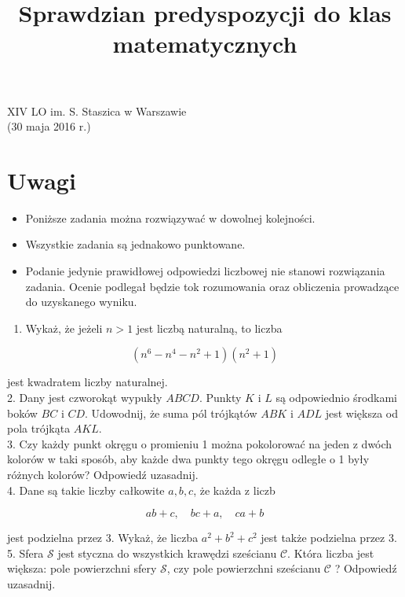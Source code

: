 \documentclass[10pt]{article}
\title{Sprawdzian predyspozycji do klas matematycznych }
\author{}
\date{}
\begin{document}
\maketitle
XIV LO im. S. Staszica w Warszawie\\
(30 maja 2016 r.)

\section*{Uwagi}
\begin{itemize}
  \item Poniższe zadania można rozwiązywać w dowolnej kolejności.
  \item Wszystkie zadania są jednakowo punktowane.
  \item Podanie jedynie prawidłowej odpowiedzi liczbowej nie stanowi rozwiązania zadania. Ocenie podlegał będzie tok rozumowania oraz obliczenia prowadzące do uzyskanego wyniku.
\end{itemize}

\begin{enumerate}
  \item Wykaż, że jeżeli \(n>1\) jest liczbą naturalną, to liczba
\end{enumerate}

\[
\left(n^{6}-n^{4}-n^{2}+1\right)\left(n^{2}+1\right)
\]

jest kwadratem liczby naturalnej.\\
2. Dany jest czworokąt wypukły \(A B C D\). Punkty \(K\) i \(L\) są odpowiednio środkami boków \(B C\) i \(C D\). Udowodnij, że suma pól trójkątów \(A B K\) i \(A D L\) jest większa od pola trójkąta \(A K L\).\\
3. Czy każdy punkt okręgu o promieniu 1 można pokolorować na jeden z dwóch kolorów w taki sposób, aby każde dwa punkty tego okręgu odległe o 1 były różnych kolorów? Odpowiedź uzasadnij.\\
4. Dane są takie liczby całkowite \(a, b, c\), że każda z liczb

\[
a b+c, \quad b c+a, \quad c a+b
\]

jest podzielna przez 3. Wykaż, że liczba \(a^{2}+b^{2}+c^{2}\) jest także podzielna przez 3.\\
5. Sfera \(\mathcal{S}\) jest styczna do wszystkich krawędzi sześcianu \(\mathcal{C}\). Która liczba jest większa: pole powierzchni sfery \(\mathcal{S}\), czy pole powierzchni sześcianu \(\mathcal{C}\) ? Odpowiedź uzasadnij.
\end{document}
